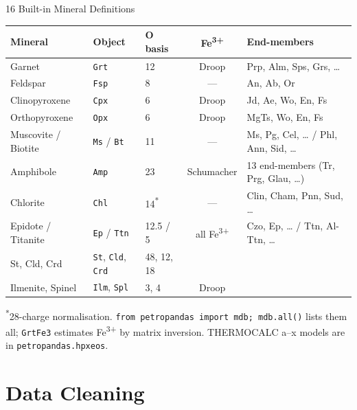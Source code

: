 \documentclass[aspectratio=169,11pt]{beamer}
\begin{document}
\begin{frame}{16 Built-in Mineral Definitions}
  \centering
  \footnotesize
  \begin{tabularx}{\textwidth}{lllcX}
    \toprule
    \textbf{Mineral} & \textbf{Object} & \textbf{O basis} & \textbf{Fe\textsuperscript{3+}} & \textbf{End-members} \\
    \midrule
    Garnet & \texttt{Grt} & 12 & Droop & Prp, Alm, Sps, Grs, \ldots \\
    Feldspar & \texttt{Fsp} & 8 & --- & An, Ab, Or \\
    Clinopyroxene & \texttt{Cpx} & 6 & Droop & Jd, Ae, Wo, En, Fs \\
    Orthopyroxene & \texttt{Opx} & 6 & Droop & MgTs, Wo, En, Fs \\
    Muscovite / Biotite & \texttt{Ms} / \texttt{Bt} & 11 & --- & Ms, Pg, Cel, \ldots{} / Phl, Ann, Sid, \ldots \\
    Amphibole & \texttt{Amp} & 23 & Schumacher & 13 end-members (Tr, Prg, Glau, \ldots) \\
    Chlorite & \texttt{Chl} & 14\textsuperscript{*} & --- & Clin, Cham, Pnn, Sud, \ldots \\
    Epidote / Titanite & \texttt{Ep} / \texttt{Ttn} & 12.5 / 5 & all Fe\textsuperscript{3+} & Czo, Ep, \ldots{} / Ttn, Al-Ttn, \ldots \\
    St, Cld, Crd & \texttt{St}, \texttt{Cld}, \texttt{Crd} & 48, 12, 18 & & \\
    Ilmenite, Spinel & \texttt{Ilm}, \texttt{Spl} & 3, 4 & Droop & \\
    \bottomrule
  \end{tabularx}

  \vspace{0.2cm}
  \raggedright
  \scriptsize \textsuperscript{*}28-charge normalisation. \texttt{from petropandas import mdb; mdb.all()} lists them all;
  \texttt{GrtFe3} estimates Fe\textsuperscript{3+} by matrix inversion.
  THERMOCALC a--x models are in \texttt{petropandas.hpxeos}.
\end{frame}

\section{Data Cleaning}
\end{document}
